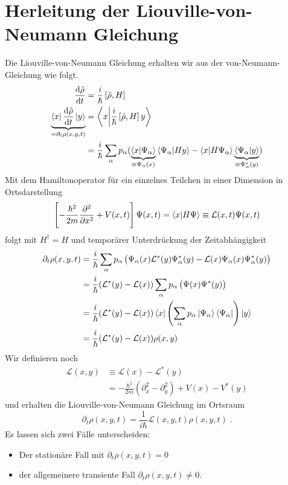 \section{Herleitung der Liouville-von-Neumann Gleichung}
Die Liouville-von-Neumann Gleichung erhalten wir aus der von-Neumann-Gleichung wie folgt.
\begin{align}
  \frac{\mathrm{d}\hat{\rho}}{\mathrm{d}t} &= \frac{i}{\hbar}\left[\hat{\rho} , H\right] \\
  \underbrace{\bra{x} \frac{\mathrm{d}\hat{\rho}}{\mathrm{d}t} \ket{y}}_{= \partial_t \rho(x,y,t)} &= \bra{x}\ket{\frac{i}{\hbar}\left[\hat{\rho} , H\right]y} \\
   &= \frac{i}{\hbar} \sum_{\alpha} p_{\alpha} ( \underbrace{\bra{x}\ket{\Psi_{\alpha}}}_{\equiv \Psi_{\alpha}(x)}\bra{\Psi_{\alpha}}\ket{Hy} - \bra{x}\ket{H\Psi_{\alpha}}\underbrace{\bra{\Psi_{\alpha}}\ket{y}}_{\equiv \Psi_{\alpha}^*(y)} )
\end{align}
Mit dem Hamiltonoperator für ein einzelnes Teilchen in einer Dimension in Ortsdarstellung
\begin{align}
  \left[ -\frac{\hbar^2}{2m}\frac{\partial^2}{\partial x^2} + V(x,t) \right] \Psi(x,t) = \bra{x}\ket{H\Psi} \equiv \mathcal{L}(x,t)\Psi(x,t)
  \label{eq:Liouville-Operator}
\end{align}
folgt mit $H^{\dagger} = H$ und temporärer Unterdrückung der Zeitabhängigkeit
\begin{align}
  \partial_t \rho(x,y,t) &= \frac{i}{\hbar} \sum_{\alpha} p_{\alpha} \left( \Psi_{\alpha}(x)\mathcal{L}^*(y)\Psi_{\alpha}^*(y) - \mathcal{L}(x)\Psi_{\alpha}(x)\Psi_{\alpha}^*(y) \right) \\
  &= \frac{i}{\hbar}  (\mathcal{L}^*(y) - \mathcal{L}(x)) \sum_{\alpha} p_{\alpha} \left( \Psi(x)\Psi^*(y) \right) \\
  &= \frac{i}{\hbar}  (\mathcal{L}^*(y) - \mathcal{L}(x)) \bra{x}\left(\sum_{\alpha} p_{\alpha}  \ket{\Psi_{\alpha}}\bra{\Psi_{\alpha}} \right)\ket{y} \\
  &= \frac{i}{\hbar}  (\mathcal{L}^*(y) - \mathcal{L}(x))\rho(x,y)
\end{align}
Wir definieren noch
\begin{align}
  \mathcal{L}(x,y) &\equiv \mathcal{L}(x) - \mathcal{L}^*(y)\\
   &= -\frac{\hbar^2}{2m}\left( \partial_x^2 - \partial_y^2 \right) + V(x) - V^*(y)
\end{align}
und erhalten die Liouville-von-Neumann Gleichung im Ortsraum
\begin{equation}
  \partial_t \rho(x,y,t) = \frac{1}{i\hbar} \mathcal{L}(x,y,t) \rho(x,y,t) \; .
  \label{eq:lvn_first}
\end{equation}
Es lassen sich zwei Fälle unterscheiden:
\begin{itemize}
  \item Der stationäre Fall mit $\partial_t \rho(x,y,t) = 0$
  \item der allgemeinere transiente Fall $\partial_t \rho(x,y,t) \neq 0$.
\end{itemize}


